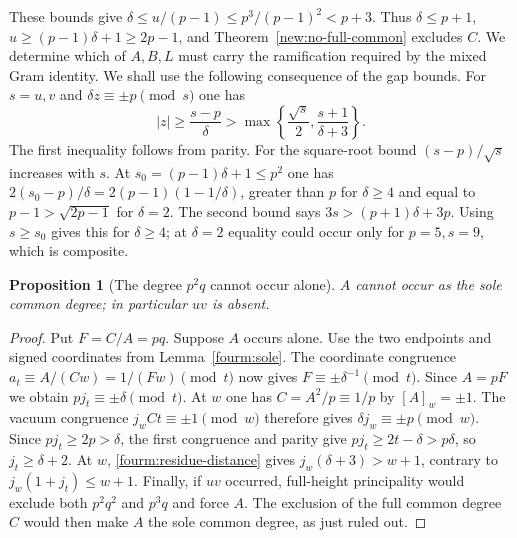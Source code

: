 \documentclass[11pt,a4paper]{article}
\numberwithin{equation}{section}
\newtheorem{proposition}[theorem]{Proposition}
\theoremstyle{remark}
\begin{document}
These bounds give $\delta\le u/(p-1)\le p^3/(p-1)^2<p+3$.
Thus $\delta\le p+1$, $u\ge(p-1)\delta+1\ge2p-1$, and
Theorem~\ref{new:no-full-common} excludes $C$. We determine which of
$A,B,L$ must carry the ramification required by the mixed Gram identity.
We shall use the following consequence of the gap bounds. For
$s=u,v$ and $\delta z\equiv\pm p\pmod s$ one has
\begin{equation}\label{fourm:residue-distance}
 |z|\ge\frac{s-p}{\delta}>
 \max\left\{\frac{\sqrt s}2,\frac{s+1}{\delta+3}\right\}.
\end{equation}
The first inequality follows from parity. For the square-root bound
$(s-p)/\sqrt s$ increases with $s$. At $s_0=(p-1)\delta+1\le p^2$
one has $2(s_0-p)/\delta=2(p-1)(1-1/\delta)$, greater than $p$ for
$\delta\ge4$ and equal to $p-1>\sqrt{2p-1}$ for $\delta=2$.
The second bound says $3s>(p+1)\delta+3p$. Using $s\ge s_0$
gives this for $\delta\ge4$; at $\delta=2$ equality could occur
only for $p=5,s=9$, which is composite.

\begin{proposition}[The degree $p^2q$ cannot occur alone]\label{fam:M:12.5}
\label{new:sole-A-global}
$A$ cannot occur as the sole common degree; in particular $uv$ is absent.
\end{proposition}
\begin{proof}
Put $F=C/A=pq$.
Suppose $A$ occurs alone. Use the two endpoints and signed
coordinates from Lemma~\ref{fourm:sole}.
The coordinate congruence $a_t\equiv A/(Cw)=1/(Fw)\pmod t$ now
gives $F\equiv\pm\delta^{-1}\pmod t$. Since $A=pF$ we obtain
$p j_t\equiv\pm\delta\pmod t$. At $w$ one has $C=A^2/p\equiv1/p$
by $[A]_w=\pm1$. The vacuum congruence $j_wCt\equiv\pm1\pmod w$
therefore gives $\delta j_w\equiv\pm p\pmod w$. Since $pj_t\ge2p>\delta$, the first congruence and parity give
$pj_t\ge2t-\delta>p\delta$, so $j_t\ge\delta+2$. At $w$,
\eqref{fourm:residue-distance} gives $j_w(\delta+3)>w+1$,
contrary to $j_w(1+j_t)\le w+1$.
Finally, if $uv$ occurred, full-height principality would exclude both $p^2q^2$ and $p^3q$ and
force $A$. The exclusion of the full common degree $C$ would then make
$A$ the sole common degree, as just ruled out.
\end{proof}
\end{document}
